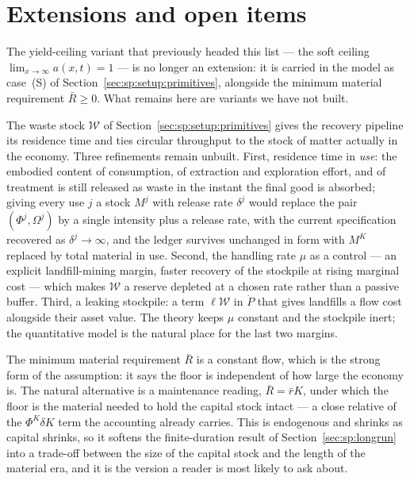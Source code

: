 \section{Extensions and open items}\label{sec:app:extensions}

The yield-ceiling variant that previously headed this list --- the soft ceiling
$\lim_{x\to\infty}a\left(x,t\right)=1$ --- is no longer an extension: it is carried in the model as
case~(S) of Section~\ref{sec:sp:setup:primitives}, alongside the minimum material requirement
$\bar R\ge0$. What remains here are variants we have not built.

 The waste stock $\mathcal W$ of
Section~\ref{sec:sp:setup:primitives} gives the recovery pipeline its residence time and ties
circular throughput to the stock of matter actually in the economy. Three refinements remain
unbuilt. First, residence time in \emph{use}: the embodied content of consumption, of extraction and
exploration effort, and of treatment is still released as waste in the instant the final good is
absorbed; giving every use $j$ a stock $M^j$ with release rate $\delta^j$ would replace the pair
$\left(\Phi^j,\Omega^j\right)$ by a single intensity plus a release rate, with the current
specification recovered as $\delta^j\to\infty$, and the ledger survives unchanged in form with
$M^K$ replaced by total material in use. Second, the handling rate $\mu$ as a control --- an
explicit landfill-mining margin, faster recovery of the stockpile at rising marginal cost --- which
makes $\mathcal W$ a reserve depleted at a chosen rate rather than a passive buffer. Third, a
leaking stockpile: a term $\ell\mathcal W$ in $\dot P$ that gives landfills a flow cost alongside
their asset value. The theory keeps $\mu$ constant and the stockpile inert; the quantitative model
is the natural place for the last two margins.

 The minimum material requirement $\bar R$ is a
constant flow, which is the strong form of the assumption: it says the floor is independent of how
large the economy is. The natural alternative is a maintenance reading, $\bar R=\bar r K$, under which
the floor is the material needed to hold the capital stock intact --- a close relative of the
$\Phi^K\delta K$ term the accounting already carries. This is endogenous and shrinks as capital
shrinks, so it softens the finite-duration result of Section~\ref{sec:sp:longrun} into a trade-off
between the size of the capital stock and the length of the material era, and it is the version a
reader is most likely to ask about.

